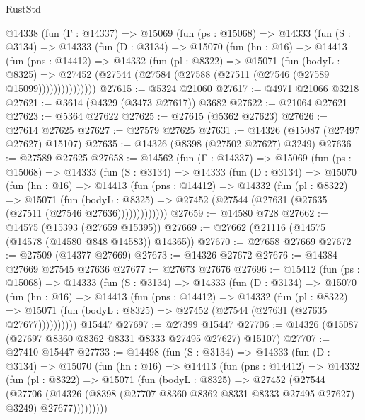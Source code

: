 \begin{lexlean}{RustStd}
\begin{coremodule}
    @14338
      (fun (Γ : @14337) =>
      @15069
        (fun (ps : @15068) =>
        @14333
          (fun (S : @3134) =>
          @14333
            (fun (D : @3134) =>
            @15070
              (fun (hn : @16) =>
              @14413
                (fun (pns : @14412) =>
                @14332
                  (fun (pl : @8322) =>
                  @15071
                    (fun (bodyL : @8325) =>
                    @27452 (@27544 (@27584 (@27588 (@27511 (@27546 (@27589 @15099)))))))))))))))
@27615 := @5324 @21060
@27617 := @4971 @21066 @3218
@27621 := @3614 (@4329 (@3473 @27617)) @3682
@27622 := @21064 @27621
@27623 := @5364 @27622
@27625 := @27615 (@5362 @27623)
@27626 := @27614 @27625
@27627 := @27579 @27625
@27631 := @14326 (@15087 (@27497 @27627) @15107)
@27635 := @14326 (@8398 (@27502 @27627) @3249)
@27636 := @27589 @27625
@27658 := @14562
    (fun (Γ : @14337) =>
    @15069
      (fun (ps : @15068) =>
      @14333
        (fun (S : @3134) =>
        @14333
          (fun (D : @3134) =>
          @15070
            (fun (hn : @16) =>
            @14413
              (fun (pns : @14412) =>
              @14332
                (fun (pl : @8322) =>
                @15071
                  (fun (bodyL : @8325) =>
                  @27452 (@27544 (@27631 (@27635 (@27511 (@27546 @27636)))))))))))))
@27659 := @14580 @728
@27662 := @14575 (@15393 (@27659 @15395))
@27669 := @27662 (@21116 (@14575 (@14578 (@14580 @848 @14583)) @14365))
@27670 := @27658 @27669
@27672 := @27509 (@14377 @27669)
@27673 := @14326 @27672
@27676 := @14384 @27669 @27545 @27636
@27677 := @27673 @27676
@27696 := @15412
    (fun (ps : @15068) =>
    @14333
      (fun (S : @3134) =>
      @14333
        (fun (D : @3134) =>
        @15070
          (fun (hn : @16) =>
          @14413
            (fun (pns : @14412) =>
            @14332
              (fun (pl : @8322) =>
              @15071 (fun (bodyL : @8325) => @27452 (@27544 (@27631 (@27635 @27677))))))))))
    @15447
@27697 := @27399 @15447
@27706 := @14326 (@15087 (@27697 @8360 @8362 @8331 @8333 @27495 @27627) @15107)
@27707 := @27410 @15447
@27733 := @14498
    (fun (S : @3134) =>
    @14333
      (fun (D : @3134) =>
      @15070
        (fun (hn : @16) =>
        @14413
          (fun (pns : @14412) =>
          @14332
            (fun (pl : @8322) =>
            @15071
              (fun (bodyL : @8325) =>
              @27452
                (@27544
                  (@27706
                    (@14326
                      (@8398 (@27707 @8360 @8362 @8331 @8333 @27495 @27627) @3249)
                      @27677)))))))))

\end{coremodule}
\end{lexlean}

